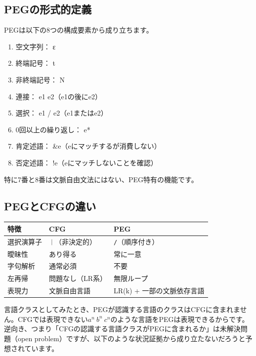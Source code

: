 \subsection{PEGの形式的定義}

PEGは以下の8つの構成要素から成り立ちます。

\begin{enumerate}
\item
  空文字列： ε
\item
  終端記号： t
\item
  非終端記号： N
\item
  連接： e1 e2（e1の後にe2）
\item
  選択： e1 / e2（e1またはe2）
\item
  0回以上の繰り返し： e*
\item
  肯定述語： \&e（eにマッチするが消費しない）
\item
  否定述語： !e（eにマッチしないことを確認）
\end{enumerate}

特に7番と8番は文脈自由文法にはない、PEG特有の機能です。

\subsection{PEGとCFGの違い}

\begin{table}[h]
  \begin{center}
    \begin{tabular}{lll}\hline
      特徴 & CFG & PEG\\ \hline
      選択演算子 & \texttt{｜}（非決定的） & \texttt{/}（順序付き）\\ \hline
      曖昧性 & あり得る & 常に一意\\ \hline
      字句解析 & 通常必須 & 不要\\ \hline
      左再帰 & 問題なし（LR系） & 無限ループ\\ \hline
      表現力 & 文脈自由言語 & LR(k) + 一部の文脈依存言語\\ \hline
    \end{tabular}
  \end{center}
\end{table}

言語クラスとしてみたとき、PEGが認識する言語のクラスはCFGに含まれません。CFGでは表現できない\(a^n\ b^n\ c^n\)のような言語をPEGは表現できるからです。逆向き、つまり「CFGの認識する言語クラスがPEGに含まれるか」は未解決問題（open
problem）ですが、以下のような状況証拠から成り立たないだろうと予想されています。

